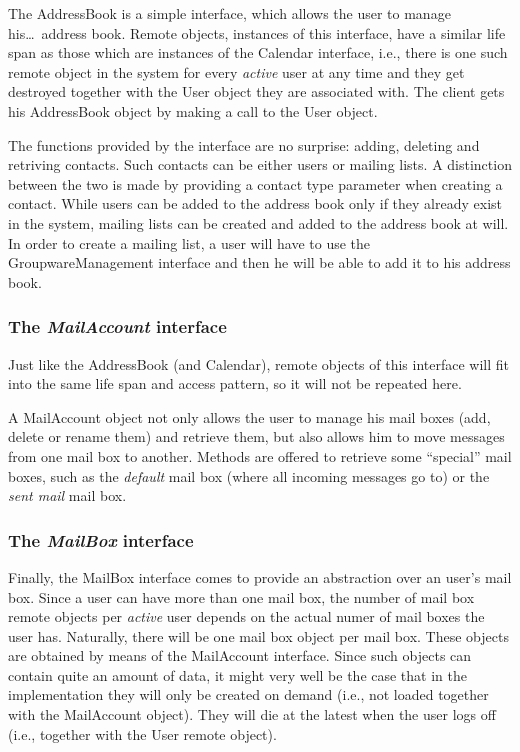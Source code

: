 \documentclass[a4paper,10pt]{article}
\begin{document}
The AddressBook is a simple interface, which allows the user to manage his\ldots\ address book.
Remote objects, instances of this interface, have a similar life span as those which are instances
of the Calendar interface, i.e., there is one such remote object in the system for every \emph{active}
user at any time and they get destroyed together with the User object they are associated with.
The client gets his AddressBook object by making a call to the User object.

The functions provided by the interface are no surprise: adding, deleting and retriving contacts.
Such contacts can be either users or mailing lists. A distinction between the two is made by
providing a contact type parameter when creating a contact. While users can be added to the
address book only if they already exist in the system, mailing lists can be created and added
to the address book at will. In order to create a mailing list, a user will have to use the
GroupwareManagement interface and then he will be able to add it to his address book.

\subsubsection*{The \emph{MailAccount} interface}

Just like the AddressBook (and Calendar), remote objects of this interface will fit into the same
life span and access pattern, so it will not be repeated here.

A MailAccount object not only allows the user to manage his mail boxes (add, delete or rename
them) and retrieve them, but also allows him to move messages from one mail box to another.
Methods are offered to retrieve some ``special'' mail boxes, such as the \emph{default} mail
box (where all incoming messages go to) or the \emph{sent mail} mail box.

\subsubsection*{The \emph{MailBox} interface}

Finally, the MailBox interface comes to provide an abstraction over an user's mail box. Since
a user can have more than one mail box, the number of mail box remote objects per \emph{active}
user depends on the actual numer of mail boxes the user has. Naturally, there will be one
mail box object per mail box. These objects are obtained by means of the MailAccount interface.
Since such objects can contain quite an amount of data, it might very well be the case
that in the implementation they will only be created on demand (i.e., not loaded together
with the MailAccount object). They will die at the latest when the user logs off (i.e., together
with the User remote object).
\end{document}
